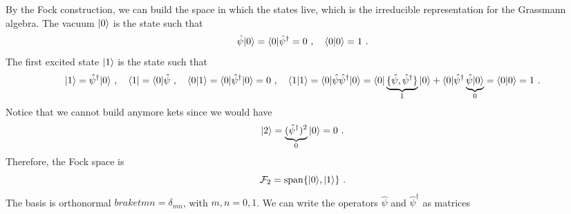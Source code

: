     By the Fock construction, we can build the space in which the states live, which is the irreducible representation for the Grassmann algebra. The vacuum $\vert0\rangle$ is the state such that 
    \begin{equation*}
        \hat \psi \vert0\rangle = \langle0\vert \hat \psi^\dagger = 0 ~, \quad \langle0\vert0\rangle = 1 ~.
    \end{equation*}
    The first excited state $\vert1\rangle$ is the state such that
    \begin{equation*}
        \vert1\rangle = \hat \psi^\dagger \vert0\rangle ~, \quad \langle1\vert = \langle0\vert \hat \psi ~, \quad \langle0\vert1\rangle = \langle0\vert \hat \psi^\dagger \vert0\rangle = 0 ~, \quad \langle1\vert1\rangle = \langle0\vert \hat \psi \hat \psi^\dagger \vert0\rangle = \langle0\vert \underbrace{\{\hat \psi, \hat \psi^\dagger\}}_1 \vert0\rangle + \langle0\vert \hat \psi^\dagger \underbrace{\hat \psi \vert0\rangle}_0 = \langle0\vert0\rangle = 1 ~.
    \end{equation*}
    Notice that we cannot build anymore kets since we would have 
    \begin{equation*}
        \vert2\rangle = \underbrace{(\hat \psi^\dagger)^2}_0 \vert0\rangle = 0 ~.
    \end{equation*}
    Therefore, the Fock space is 
    \begin{equation*}
        \mathcal F_2 = \operatorname{span} \{\vert0\rangle, \vert1\rangle \} ~.
    \end{equation*}
    The basis is orthonormal $braket{m}{n} = \delta_{mn}$, with $m, n = 0, 1$. We can write the operators $\hat \psi$ and $\hat \psi^\dagger$ as matrices
